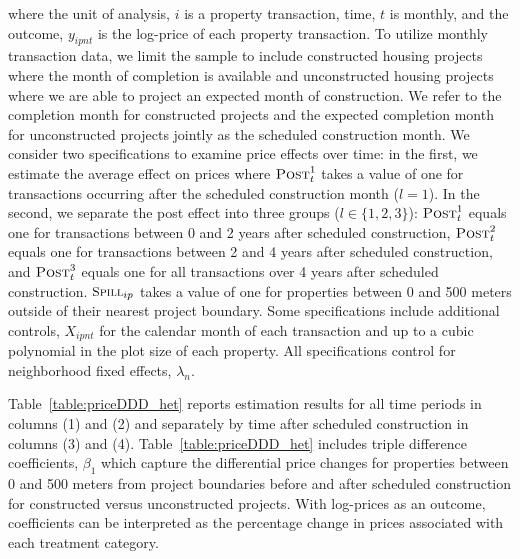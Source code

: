 \documentclass[12pt]{article}
\begin{document}
\noindent where the unit of analysis, $i$ is a property transaction, time, $t$ is monthly, and the outcome, $y_{ipnt}$ is the log-price of each property transaction.  To utilize monthly transaction data, we limit the sample to include constructed housing projects where the month of completion is available and unconstructed housing projects where we are able to project an expected month of construction.  We refer to the completion month for constructed projects and the expected completion month for unconstructed projects jointly as the scheduled construction month.  We consider two specifications to examine price effects over time:  in the first, we estimate the average effect on prices where $\textsc{Post}^{1}_{t}$ takes a value of one for transactions occurring after the scheduled construction month ($l=1$).  In the second, we separate the post effect into three groups ($l\in \{1,2,3\}$):  $\textsc{Post}^{1}_{t}$ equals one for transactions between 0 and 2 years after scheduled construction, $\textsc{Post}^{2}_{t}$ equals one for transactions between 2 and 4 years after scheduled construction, and $\textsc{Post}^{3}_{t}$ equals one for all transactions over 4 years after scheduled construction.  $\textsc{\small Spill}_{ip}$ takes a value of one for properties between 0 and 500 meters outside of their nearest project boundary.  Some specifications include additional controls, $X_{ipnt}$ for the calendar month of each transaction and up to a cubic polynomial in the plot size of each property.  All specifications control for neighborhood fixed effects, $\lambda_n$.  %

Table~\ref{table:priceDDD_het} reports estimation results for all time periods  in columns (1) and (2) and separately by time after scheduled construction in columns (3) and (4).  Table~\ref{table:priceDDD_het} includes triple difference coefficients, $\beta_1$ which capture the differential price changes for properties between 0 and 500 meters from project boundaries before and after scheduled construction for constructed versus unconstructed projects.  With log-prices as an outcome, coefficients can be interpreted as the percentage change in prices associated with each treatment category.
\end{document}
